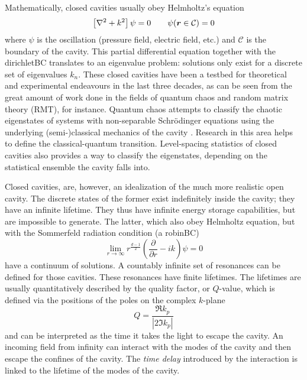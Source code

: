 Mathematically, closed cavities usually obey Helmholtz's equation
  \begin{equation}
   \left[\nabla^2+k^2\right]\psi=0\qquad \psi(\boldsymbol{r}\in\mathcal{C})=0
  \end{equation}
where $\psi$ is the oscillation (pressure field, electric field, etc.)
and $\mathcal{C}$ is the boundary of the cavity. This partial differential
equation together with the \gls{dirichletBC} translates to an
eigenvalue problem: solutions only exist for a discrete set of eigenvalues 
$k_n$. These closed cavities have been a testbed for theoretical
and experimental endeavours in the last three decades, as can be
seen from the great amount of work done in the fields of quantum 
chaos and random matrix theory (RMT), for instance. Quantum chaos attempts
to classify the chaotic eigenstates of systems with non-separable Schrödinger
equations using the underlying (semi-)classical mechanics of the 
cavity \cite{BLU1990}. Research in this area helps to define the classical-quantum
transition. Level-spacing statistics of closed cavities also provides
a way to classify the eigenstates, depending on the statistical 
ensemble the cavity falls into. 

Closed cavities, are, however, an idealization of the much more
realistic open cavity. The discrete states of the former exist 
indefinitely inside the cavity; they have an infinite lifetime. 
They thus have infinite energy storage capabilities, but are impossible 
to generate. The latter, which also obey Helmholtz equation, but with the 
Sommerfeld radiation condition (a \gls{robinBC})
  \begin{equation}
   \lim_{r\rightarrow\infty}r^{\frac{d-1}{2}}\left(\frac{\partial}{\partial r}-ik\right)\psi=0
  \end{equation}
have a continuum of solutions. A countably infinite set of resonances
can be defined for those cavities. These resonances have finite lifetimes.
The lifetimes are usually quantitatively described by the quality
factor, or $Q$-value, which is defined via the positions of the poles
on the complex $k$-plane 
	\begin{equation}
		Q = \frac{\Re{k_p}}{|2\Im{k_p}|}
	\end{equation}
and can be interpreted as the time it takes the light to escape the 
cavity.
An incoming field from infinity can interact with the modes of the
cavity and then escape the confines of the cavity. The \textit{time delay} introduced
by the interaction is linked to the lifetime of the modes of the cavity. 

